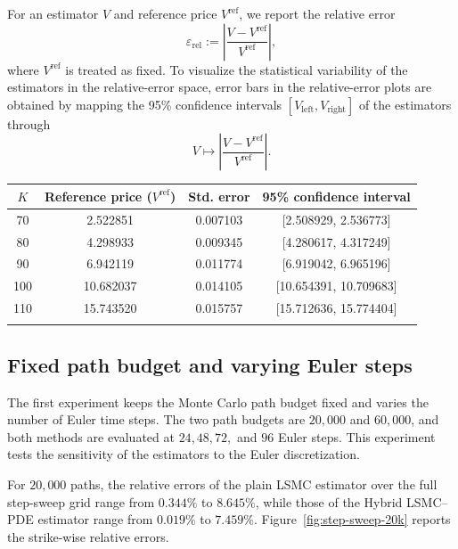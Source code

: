 \documentclass[pdflatex,sn-mathphys-num]{sn-jnl}
\makeatletter
\theoremstyle{thmstyleone}%
\theoremstyle{thmstylethree}%
\theoremstyle{thmstyletwo}%
\renewenvironment{table}[1][]{%
  \par\addvspace{12pt}%
  \noindent\begin{minipage}{\textwidth}%
  \def\@captype{table}%
  \centering%
  \tablebodyfont%
}{%
  \end{minipage}%
  \par\addvspace{12pt}%
}
\makeatother
\begin{document}
For an estimator $V$ and reference price $V^{\mathrm{ref}}$, we report the relative error
$$
\varepsilon_{\mathrm{rel}}
:=
\left| \frac{V-V^{\mathrm{ref}}}{V^{\mathrm{ref}}} \right|,
$$
where $V^{\mathrm{ref}}$ is treated as fixed. To visualize the statistical variability of the estimators in the relative-error space, error bars in the relative-error plots are obtained by mapping the 95\% confidence intervals $[V_{\mathrm{left}},V_{\mathrm{right}}]$ of the estimators through
\[
V \mapsto \left| \frac{V - V^{\mathrm{ref}}}{V^{\mathrm{ref}}}\right|.
\]



\begin{table}[htbp]
\centering
\caption{LSMC reference values for the parameter set in Table~\ref{tab:parameter-setup}.}
\label{tab:reference-prices}
\small
\begin{tabularx}{0.82\textwidth}{@{}cccc@{}}
\toprule
$K$ & Reference price ($V^{\mathrm{ref}}$) & Std. error & 95\% confidence interval \\
\midrule
70 & 2.522851 & 0.007103 & [2.508929, 2.536773] \\
80 & 4.298933 & 0.009345 & [4.280617, 4.317249] \\
90 & 6.942119 & 0.011774 & [6.919042, 6.965196] \\
100 & 10.682037 & 0.014105 & [10.654391, 10.709683] \\
110 & 15.743520 & 0.015757 & [15.712636, 15.774404] \\
\botrule
\end{tabularx}
\end{table}

\subsection{Fixed path budget and varying Euler steps}

The first experiment keeps the Monte Carlo path budget fixed and varies the number of
Euler time steps. The two path budgets are $20{,}000$ and $60{,}000$, and
both methods are evaluated at $24,48,72,$ and $96$ Euler steps. This
experiment tests the sensitivity of the estimators to the Euler
discretization.

For $20{,}000$ paths, the relative errors of the plain LSMC estimator over the full step-sweep grid range from $0.344\%$ to $8.645\%$, while those of the Hybrid LSMC--PDE estimator range from 
$0.019\%$ to $7.459\%$. Figure~\ref{fig:step-sweep-20k} reports the strike-wise
relative errors. 
\end{document}
